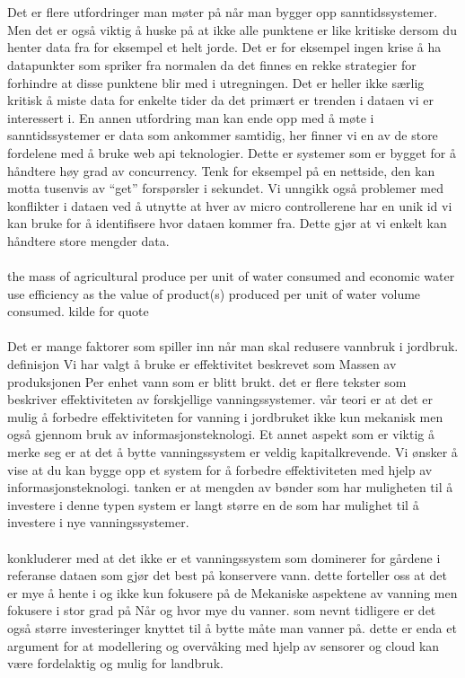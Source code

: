 \documentclass[]{uiophd}
\begin{document}
\\\\
Det er flere utfordringer man møter på når man bygger opp sanntidssystemer. Men det er også viktig å huske på at ikke alle punktene er like kritiske dersom du henter data fra for eksempel et helt jorde. Det er for eksempel ingen krise å ha datapunkter som spriker fra normalen da det finnes en rekke strategier for forhindre at disse punktene blir med i utregningen. Det er heller ikke særlig kritisk å miste data for enkelte tider da det primært er trenden i dataen vi er interessert i. En annen utfordring man kan ende opp med å møte i sanntidssystemer er data som ankommer samtidig, her finner vi en av de store fordelene med å bruke web api teknologier. Dette er systemer som er bygget for å håndtere høy grad av concurrency. Tenk for eksempel på en nettside, den kan motta tusenvis av “get” forspørsler i sekundet. Vi unngikk også problemer med konflikter i dataen ved å utnytte at hver av micro controllerene har en unik id vi kan bruke for å identifisere hvor dataen kommer fra. Dette gjør at vi enkelt kan håndtere store mengder data.
\\\\
 the mass of agricultural produce per unit of water consumed and economic water use efficiency as the value of product(s) produced per unit of water volume consumed.
kilde for quote
\\\\
Det er mange faktorer som spiller inn når man skal redusere vannbruk i jordbruk.   definisjon Vi har valgt å bruke er effektivitet beskrevet som Massen av produksjonen Per enhet vann som er blitt  brukt.  det er flere tekster som beskriver effektiviteten av forskjellige vanningssystemer.  vår  teori er at det er mulig å forbedre effektiviteten for vanning i jordbruket ikke kun mekanisk men også gjennom bruk av informasjonsteknologi. Et annet aspekt som er viktig å merke seg er at det å bytte vanningssystem er veldig kapitalkrevende. Vi ønsker å vise at du kan bygge opp et system for å forbedre effektiviteten med hjelp av informasjonsteknologi.  tanken er at mengden av  bønder  som har muligheten til å investere i denne typen system er langt større en de som har mulighet til å investere i nye vanningssystemer. 
\\\\
[Sett inn artikkel fra over]  konkluderer med at det ikke er et vanningssystem som dominerer for gårdene i referanse dataen som gjør det best på konservere vann.  dette forteller oss at det er mye å hente i og ikke kun fokusere på  de Mekaniske aspektene av vanning men fokusere i stor grad på  Når og hvor mye du vanner.  som nevnt tidligere er det også større investeringer knyttet til å bytte måte man vanner på.  dette er enda et argument for at modellering og overvåking med hjelp av sensorer og cloud kan være fordelaktig og  mulig for landbruk.
\end{document}
